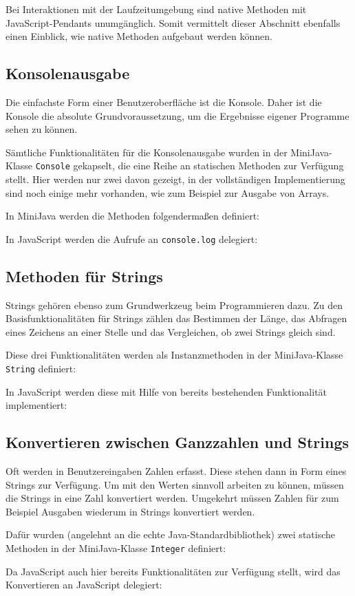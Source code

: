 Bei Interaktionen mit der Laufzeitumgebung sind native Methoden mit JavaScript-Pendants unumgänglich. Somit vermittelt dieser Abschnitt ebenfalls einen Einblick, wie native Methoden aufgebaut werden können.

\subsection{Konsolenausgabe}
Die einfachste Form einer Benutzeroberfläche ist die Konsole. Daher ist die Konsole die absolute Grundvoraussetzung, um die Ergebnisse eigener Programme sehen zu können.

Sämtliche Funktionalitäten für die Konsolenausgabe wurden in der MiniJava-Klasse \lstinline{Console} gekapselt, die eine Reihe an statischen Methoden zur Verfügung stellt. Hier werden nur zwei davon gezeigt, in der vollständigen Implementierung sind noch einige mehr vorhanden, wie zum Beispiel zur Ausgabe von Arrays.

In MiniJava werden die Methoden folgendermaßen definiert:


In JavaScript werden die Aufrufe an \lstinline{console.log} delegiert:


\subsection{Methoden für Strings}

Strings gehören ebenso zum Grundwerkzeug beim Programmieren dazu. Zu den Basisfunktionalitäten für Strings zählen das Bestimmen der Länge, das Abfragen eines Zeichens an einer Stelle und das Vergleichen, ob zwei Strings gleich sind.

Diese drei Funktionalitäten werden als Instanzmethoden in der MiniJava-Klasse \lstinline{String} definiert:


In JavaScript werden diese mit Hilfe von bereits bestehenden Funktionalität implementiert:


\subsection{Konvertieren zwischen Ganzzahlen und Strings}

Oft werden in Benutzereingaben Zahlen erfasst. Diese stehen dann in Form eines Strings zur Verfügung. Um mit den Werten sinnvoll arbeiten zu können, müssen die Strings in eine Zahl konvertiert werden. Umgekehrt müssen Zahlen für zum Beispiel Ausgaben wiederum in Strings konvertiert werden.

Dafür wurden (angelehnt an die echte Java-Standardbibliothek) zwei statische Methoden in der MiniJava-Klasse \lstinline{Integer} definiert:


Da JavaScript auch hier bereits Funktionalitäten zur Verfügung stellt, wird das Konvertieren an JavaScript delegiert:

